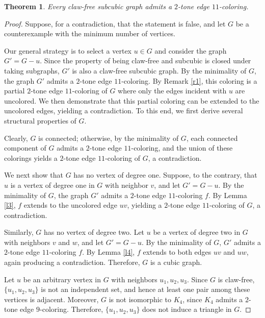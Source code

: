 \documentclass[10pt,a4paper]{amsart}
\newtheorem{theorem}{Theorem}
\begin{document}
\begin{theorem}\label{t5}
Every claw-free subcubic graph admits a $2$-tone edge $11$-coloring.
\end{theorem}

\begin{proof}
Suppose, for a contradiction, that the statement is false, and let $G$ be a counterexample with the minimum number of vertices.

\noindent Our general strategy is to select a vertex $u \in G$ and consider the graph $G' = G - u$. Since the property of being claw-free and subcubic is closed under taking subgraphs, $G'$ is also a claw-free subcubic graph. By the minimality of $G$, the graph $G'$ admits a $2$-tone edge $11$-coloring. By Remark \ref{r1}, this coloring is a partial $2$-tone edge $11$-coloring of $G$ where only the edges incident with $u$ are uncolored. We then demonstrate that this partial coloring can be extended to the uncolored edges, yielding a contradiction. To this end, we first derive several structural properties of $G$.

\noindent Clearly, $G$ is connected; otherwise, by the minimality of $G$, each connected component of $G$ admits a $2$-tone edge $11$-coloring, and the union of these colorings yields a $2$-tone edge $11$-coloring of $G$, a contradiction.

\noindent We next show that $G$ has no vertex of degree one. Suppose, to the contrary, that $u$ is a vertex of degree one in $G$ with neighbor $v$, and let $G' = G - u$. By the minimality of $G$, the graph $G'$ admits a $2$-tone edge $11$-coloring $f$. By Lemma \ref{l3}, $f$ extends to the uncolored edge $uv$, yielding a $2$-tone edge $11$-coloring of $G$, a contradiction.

\noindent Similarly, $G$ has no vertex of degree two. Let $u$ be a vertex of degree two in $G$ with neighbors $v$ and $w$, and let $G' = G - u$. By the minimality of $G$, $G'$ admits a $2$-tone edge $11$-coloring $f$. By Lemma \ref{l4}, $f$ extends to both edges $uv$ and $uw$, again producing a contradiction. Therefore, $G$ is a cubic graph.

\noindent Let $u$ be an arbitrary vertex in $G$ with neighbors $u_1,u_2,u_3$. Since $G$ is claw-free, $\{u_1,u_2,u_3\}$ is not an independent set, and hence at least one pair among these vertices is adjacent. Moreover, $G$ is not isomorphic to $K_4$, since $K_4$ admits a $2$-tone edge $9$-coloring. Therefore, $\{u_1,u_2,u_3\}$ does not induce a triangle in $G$.


\end{proof}
\end{document}
